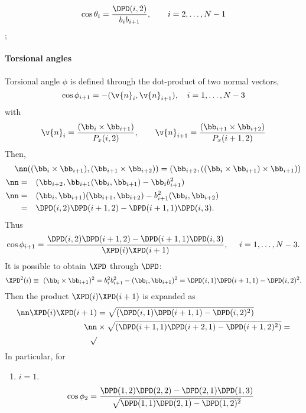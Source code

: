 \begin{equation}
  \cos\theta_i=\frac{\DPD(i,2)}{b_ib_{i+1}},\qquad i=2,\ldots,N-1  
  \label{bln-bangle}
\end{equation};

\paragraph{Torsional angles}

Torsional angle $\phi$ is defined through the dot-product of two normal vectors,
\begin{equation}
  \cos\phi_{i+1}=-(\v{n}_i,\v{n}_{i+1}),\quad i=1,\ldots,N-3
\end{equation}
with
\begin{equation}
  \v{n}_i=\frac{(\bb_i\times\bb_{i+1})}{P_x(i,2)},\qquad
  \v{n}_{i+1}=\frac{(\bb_{i+1}\times\bb_{i+2})}{P_x(i+1,2)}
\end{equation}
Then,
\begin{align}
\nn&((\bb_i\times\bb_{i+1}),(\bb_{i+1}\times\bb_{i+2}))=
(\bb_{i+2},((\bb_i\times\bb_{i+1})\times\bb_{i+1}))\\
\nn=&\quad(\bb_{i+2},\bb_{i+1}(\bb_i,\bb_{i+1})-\bb_ib_{i+1}^2)\\
\nn=&\quad(\bb_i,\bb_{i+1})(\bb_{i+1},\bb_{i+2})-b_{i+1}^2(\bb_i,\bb_{i+2})\\
=&\quad\DPD(i,2)\DPD(i+1,2)-\DPD(i+1,1)\DPD(i,3).
\end{align}
Thus
\begin{equation}
  \cos\phi_{i+1}=\frac{\DPD(i,2)\DPD(i+1,2)-\DPD(i+1,1)\DPD(i,3)}{\XPD(i)\XPD(i+1)},
  \quad\ i=1,\ldots,N-3.
  \label{bln-def-tangle}
\end{equation}
It is possible to obtain $\XPD$ through $\DPD$:
\begin{equation}
  \XPD^2(i)\equiv\ (\bb_i\times\bb_{i+1})^2
  =b_i^2b_{i+1}^2-(\bb_i,\bb_{i+1})^2
  =\DPD(i,1)\DPD(i+1,1)-\DPD(i,2)^2.
\end{equation}
Then the product $\XPD(i)\XPD(i+1)$ is expanded as
\begin{align}
  \nn\XPD(i)\XPD(i+1)&=\sqrt{(\DPD(i,1)\DPD(i+1,1)-\DPD(i,2)^2)}\\
  \nn&\times\sqrt{(\DPD(i+1,1)\DPD(i+2,1)-\DPD(i+1,2)^2)}=\\
  \sqrt{}
\end{align}
In particular, for 
\begin{enumerate}
  \item $i=1$. 
    \begin{equation}
      \cos\phi_2=\frac
      {\DPD(1,2)\DPD(2,2)-\DPD(2,1)\DPD(1,3)}
      {\sqrt{\DPD(1,1)\DPD(2,1)-\DPD(1,2)^2}}
    \end{equation}
\end{enumerate}

